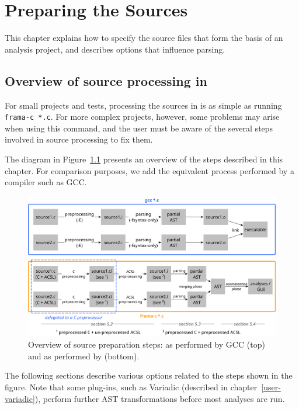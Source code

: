 \chapter{Preparing the Sources}
\label{user-sources}

This chapter explains how to specify the source files that form the
basis of an analysis project, and describes options that influence parsing.

\section{Overview of source processing in \FramaC}\label{sec:overview}

For small projects and tests, processing the sources in \FramaC is as simple
as running \texttt{frama-c *.c}. For more complex projects, however,
some problems may arise when using this command, and the user must be aware
of the several steps involved in \FramaC source processing to fix them.

The diagram in Figure~\ref{fig:source-preparation} presents an overview
of the steps described in this chapter. For comparison purposes, we add
the equivalent process performed by a compiler such as GCC.

\begin{figure}[htbp]
  \begin{center}
    \includegraphics[width=\textwidth]{source-preparation.pdf}
    \caption{Overview of source preparation steps: as performed by GCC
      (top) and as performed by \FramaC (bottom).}
    \label{fig:source-preparation}
  \end{center}
\end{figure}

The following sections describe various options related to the steps shown
in the figure. Note that some plug-ins, such as \textsf{Variadic}
(described in chapter~\ref{user-variadic}), perform further AST
transformations before most analyses are run.

